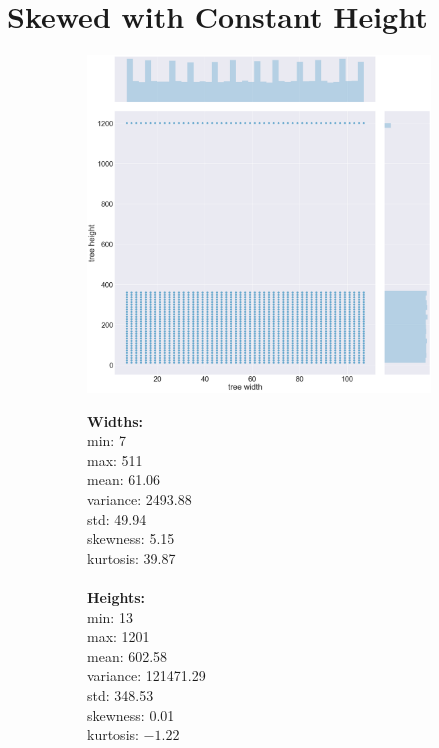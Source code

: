 \section{Skewed with Constant Height}
\label{appendix:data:skewedconstheight}
\begin{figure}[H]
\centering
\begin{subfigure}{.8\textwidth}
	\includegraphics[width=.9\textwidth]{img/5_SKEWEDCONSTHEIGHT_plot.png}
\end{subfigure}%
\begin{subfigure}{.2\textwidth}
  \centering
  \begin{minipage}{1\textwidth}
\textbf{Widths:}
\\
min: 7
\\
max: 511
\\
mean: 61.06
\\
variance: 2493.88
\\
std: 49.94
\\
skewness: 5.15
\\
kurtosis: 39.87
\\\\
\textbf{Heights:}
\\
min: 13
\\
max: 1201
\\
mean: 602.58
\\
variance: 121471.29
\\
std: 348.53
\\
skewness: 0.01
\\
kurtosis: $-1.22$
  \end{minipage}
\end{subfigure}
\end{figure}
